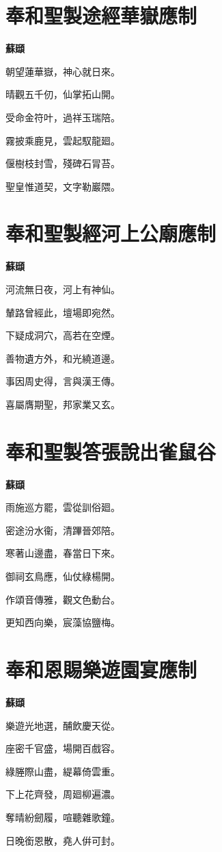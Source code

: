 \documentclass[12pt,a4paper]{ctexbook}
\begin{document}
\section{奉和聖製途經華嶽應制}
\textbf{蘇頲}\par\vspace{0.5em}
朝望蓮華嶽，神心就日來。\par
晴觀五千仞，仙掌拓山開。\par
受命金符叶，過祥玉瑞陪。\par
霧披乘鹿見，雲起馭龍廻。\par
偃樹枝封雪，殘碑石冐苔。\par
聖皇惟道契，文字勒巖隈。\par

\section{奉和聖製經河上公廟應制}
\textbf{蘇頲}\par\vspace{0.5em}
河流無日夜，河上有神仙。\par
輦路曾經此，壇場即宛然。\par
下疑成洞穴，高若在空煙。\par
善物遺方外，和光繞道邊。\par
事因周史得，言與漢王傳。\par
喜屬膺期聖，邦家業又玄。\par

\section{奉和聖製答張說出雀鼠谷}
\textbf{蘇頲}\par\vspace{0.5em}
雨施巡方罷，雲從訓俗廻。\par
密途汾水衞，清蹕晉郊陪。\par
寒著山邊盡，春當日下來。\par
御祠玄鳥應，仙仗綠楊開。\par
作頌音傳雅，觀文色動台。\par
更知西向樂，宸藻協鹽梅。\par

\section{奉和恩賜樂遊園宴應制}
\textbf{蘇頲}\par\vspace{0.5em}
樂遊光地選，酺飲慶天從。\par
座密千官盛，場開百戲容。\par
綠塍際山盡，緹幕倚雲重。\par
下上花齊發，周廻柳遍濃。\par
奪晴紛劒履，喧聽雜歌鐘。\par
日晚銜恩散，堯人倂可封。\par
\end{document}
